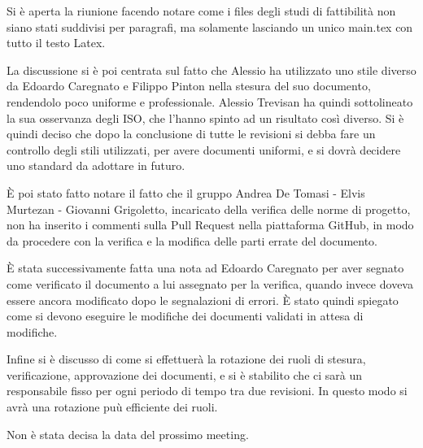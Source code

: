 Si è aperta la riunione facendo notare come i files degli studi di fattibilità non siano stati suddivisi per paragrafi,
ma solamente lasciando un unico main.tex con tutto il testo Latex.

La discussione si è poi centrata sul fatto che Alessio ha utilizzato uno stile diverso da Edoardo Caregnato e Filippo Pinton nella stesura
del suo documento, rendendolo poco uniforme e professionale. Alessio Trevisan ha quindi sottolineato la sua osservanza degli ISO, che l'hanno spinto ad un risultato così diverso. 
Si è quindi deciso che dopo la conclusione di tutte le revisioni si debba fare un controllo degli stili utilizzati, per avere documenti uniformi, e si dovrà decidere uno standard da adottare in futuro.

È poi stato fatto notare il fatto che il gruppo Andrea De Tomasi - Elvis Murtezan - Giovanni Grigoletto, incaricato della verifica delle norme di progetto, non ha inserito i commenti
sulla Pull Request nella piattaforma GitHub, in modo da procedere con la verifica e la modifica delle parti errate del documento.

È stata successivamente fatta una nota ad Edoardo Caregnato per aver segnato come verificato il documento a lui assegnato per la verifica, quando invece doveva essere
ancora modificato dopo le segnalazioni di errori. È stato quindi spiegato come si devono eseguire le modifiche dei documenti validati in attesa di modifiche.

Infine si è discusso di come si effettuerà la rotazione dei ruoli di stesura, verificazione, approvazione dei documenti, e si è stabilito che ci sarà un responsabile
fisso per ogni periodo di tempo tra due revisioni. In questo modo si avrà una rotazione puù efficiente dei ruoli.

Non è stata decisa la data del prossimo meeting.